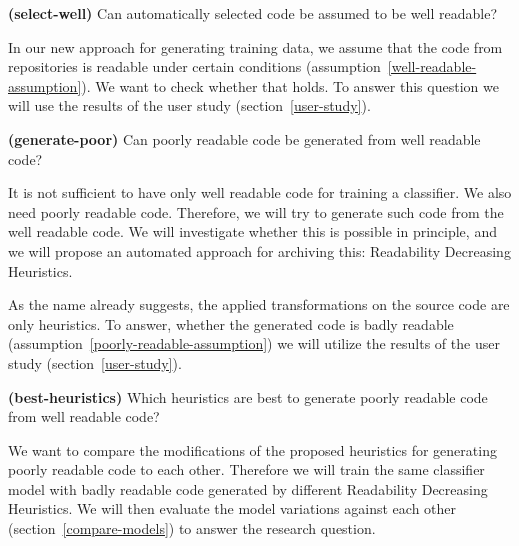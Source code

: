 \documentclass[%
class=scrreprt,
chapterprefix=false,%
open=right,%
twoside=false,%
paper=a4,%
logofile={Logo\_zentral\_farbig\_EN.png},%
thesistype=master,%
UKenglish,%
]{se2thesis}
\begin{document}
	
	\begin{resq} \textbf{(select-well)} Can automatically selected code be assumed to be well readable?\end{resq} \label{select-well}
	In our new approach for generating training data, we assume that the code from repositories is readable under certain conditions (assumption~\ref{well-readable-assumption}). We want to check whether that holds. To answer this question we will use the results of the user study (section~\ref{user-study}).
	
	\begin{resq} \textbf{(generate-poor)} Can poorly readable code be generated from well readable code?\end{resq} \label{generate-poor}
	It is not sufficient to have only well readable code for training a classifier. We also need poorly readable code. Therefore, we will try to generate such code from the well readable code. We will investigate whether this is possible in principle, and we will propose an automated approach for archiving this: Readability Decreasing Heuristics.
	
	As the name already suggests, the applied transformations on the source code are only heuristics. To answer, whether the generated code is badly readable (assumption~\ref{poorly-readable-assumption}) we will utilize the results of the user study (section~\ref{user-study}).
	
	\begin{resq} \textbf{(best-heuristics)} Which heuristics are best to generate poorly readable code from well readable code?\end{resq} \label{best-heuristic}
	We want to compare the modifications of the proposed heuristics for generating poorly readable code to each other. Therefore we will train the same classifier model with badly readable code generated by different Readability Decreasing Heuristics. We will then evaluate the model variations against each other (section~\ref{compare-models}) to answer the research question.
	
\end{document}
